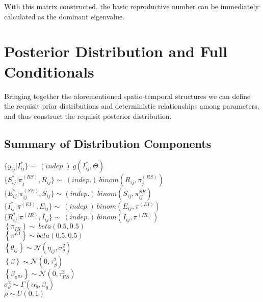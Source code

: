 \documentclass[12pt]{article}
\newcommand \noi {\noindent}
\begin{document}
With this matrix constructed, the basic reproductive number can be immediately calculated as the dominant eigenvalue. 


\section{Posterior Distribution and Full Conditionals}
Bringing together the aforementioned spatio-temporal structures we can define the requisit prior distributions and 
deterministic relationships among parameters, and thus construct the requisit posterior distribution. 

\subsection{Summary of Distribution Components}
\noi $\{y_{ij} | I^*_{ij}\} \sim\ (indep.)\ g(I^*_{ij}, \Theta)$\\

\noi $\{S_{ij}^* | \pi_j^{(RS)}, R_{ij}\} \sim\ (indep.)\  binom(R_{ij}, \pi_j^{(RS)})$\\

\noi $\{E_{ij}^* | \pi^{(SE)}_{ij}, S_{ij} \} \sim (indep.)\ binom(S_{ij}, \pi^{SE}_{ij})$ \\

\noi $\{I_{ij}^* | \pi^{(EI)}, E_{ij} \} \sim\ (indep.)\ binom(E_{ij}, \pi^{(EI)})$\\

\noi $\{R_{ij}^* | \pi^{(IR)}, I_{ij}\} \sim\ (indep.)\ binom(I_{ij}, \pi^{(IR)})$\\

\noi $\left\{\pi_{IR}  \right\} \sim\ beta(0.5, 0.5)$\\ 

\noi $\left\{\pi^{EI}  \right\} \sim beta(0.5, 0.5)$\\ 

\noi $\left\{ \theta_{ij}\right\} \sim \mathcal{N}(\eta_{ij}, \sigma^2_{\theta})$ \\

\noi $\left\{ \beta \right\} \sim \mathcal{N}(0, \tau^2_\beta) $\\ 

\noi $\left\{ \beta_{\pi^{RS}} \right\} \sim \mathcal{N}(0, \tau^2_{RS}) $\\ 

\noi $\sigma^2_{\theta} \sim \Gamma(\alpha_\theta, \beta_\theta)$\\

\noi $\rho \sim U(0,1)$
\end{document}
